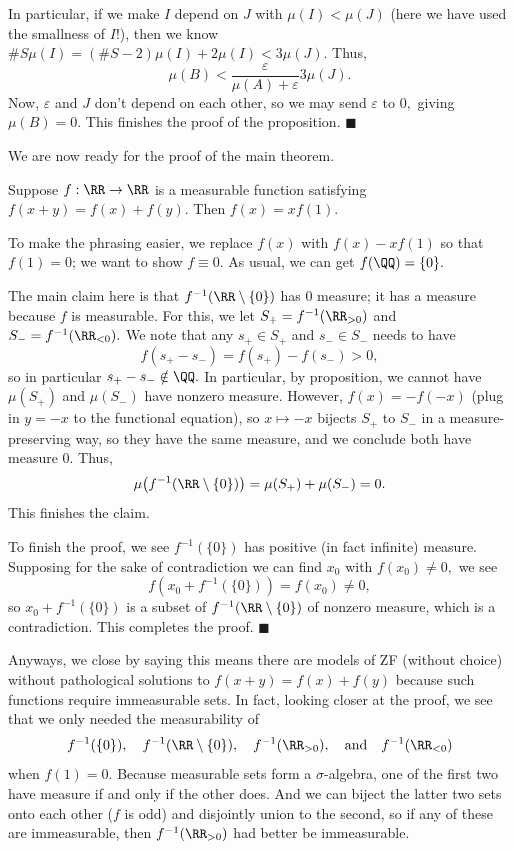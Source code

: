 In particular, if we make $I$ depend on $J$ with $\mu(I)<\mu(J)$ (here we have used the smallness of $I$!), then we know $\#S\mu(I)=(\#S-2)\mu(I)+2\mu(I)<3\mu(J).$ Thus,
\[\mu(B)<\frac{\varepsilon}{\mu(A)+\varepsilon}3\mu(J).\]
Now, $\varepsilon$ and $J$ don't depend on each other, so we may send $\varepsilon$ to $0,$ giving $\mu(B)=0.$ This finishes the proof of the proposition. $\blacksquare$

We are now ready for the proof of the main theorem.
\begin{theorem}
    Suppose $f:\RR\to\RR$ is a measurable function satisfying $f(x+y)=f(x)+f(y).$ Then $f(x)=xf(1).$
\end{theorem}
To make the phrasing easier, we replace $f(x)$ with $f(x)-xf(1)$ so that $f(1)=0$; we want to show $f\equiv0.$ As usual, we can get $f(\QQ)=\{0\}.$

The main claim here is that $f^{-1}(\RR\setminus\{0\})$ has $0$ measure; it has a measure because $f$ is measurable. For this, we let $S_+=f^{-1}(\RR_{>0})$ and $S_-=f^{-1}(\RR_{<0}).$ We note that any $s_+\in S_+$ and $s_-\in S_-$ needs to have
\[f(s_+-s_-)=f(s_+)-f(s_-)>0,\]
so in particular $s_+-s_-\notin\QQ.$ In particular, by proposition, we cannot have $\mu(S_+)$ and $\mu(S_-)$ have nonzero measure. However, $f(x)=-f(-x)$ (plug in $y=-x$ to the functional equation), so $x\mapsto-x$ bijects $S_+$ to $S_-$ in a measure-preserving way, so they have the same measure, and we conclude both have measure $0.$ Thus,
\[\mu\big(f^{-1}(\RR\setminus\{0\})\big)=\mu(S_+)+\mu(S_-)=0.\]
This finishes the claim.

To finish the proof, we see $f^{-1}(\{0\})$ has positive (in fact infinite) measure. Supposing for the sake of contradiction we can find $x_0$ with $f(x_0)\ne0,$ we see
\[f\left(x_0+f^{-1}(\{0\})\right)=f(x_0)\ne0,\]
so $x_0+f^{-1}(\{0\})$ is a subset of $f^{-1}(\RR\setminus\{0\})$ of nonzero measure, which is a contradiction. This completes the proof. $\blacksquare$

Anyways, we close by saying this means there are models of ZF (without choice) without pathological solutions to $f(x+y)=f(x)+f(y)$ because such functions require immeasurable sets. In fact, looking closer at the proof, we see that we only needed the measurability of
\[f^{-1}(\{0\}),\quad f^{-1}(\RR\setminus\{0\}),\quad f^{-1}(\RR_{>0}),\quad\text{and}\quad f^{-1}(\RR_{<0})\]
when $f(1)=0.$ Because measurable sets form a $\sigma$-algebra, one of the first two have measure if and only if the other does. And we can biject the latter two sets onto each other ($f$ is odd) and disjointly union to the second, so if any of these are immeasurable, then $f^{-1}(\RR_{>0})$ had better be immeasurable.

